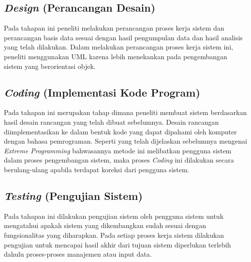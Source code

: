 \subsection{\emph{Design} (Perancangan Desain)}
Pada tahapan ini peneliti melakukan perancangan proses kerja sistem dan perancangan basis data sesuai dengan hasil pengumpulan data dan hasil analisis yang telah dilakukan. Dalam melakukan perancangan proses kerja sistem ini, peneliti menggunakan UML karena lebih menekankan pada pengembangan sistem yang berorientasi objek.
	
\subsection{\emph{Coding} (Implementasi Kode Program)}
Pada tahapan ini merupakan tahap dimana peneliti membuat sistem berdasarkan hasil desain rancangan yang telah dibuat sebelumnya. Desain rancangan diimplementasikan ke dalam bentuk kode yang dapat dipahami oleh komputer dengan bahasa pemrograman. Seperti yang telah dijelaskan sebelumnya mengenai \emph{Extreme Programming} bahwasannya metode ini melibatkan pengguna sistem dalam proses pengembangan sistem, maka proses \emph{Coding} ini dilakukan secara berulang-ulang apabila terdapat koreksi dari pengguna sistem.
	
\subsection{\emph{Testing} (Pengujian Sistem)}
Pada tahapan ini dilakukan pengujian sistem oleh pengguna sistem untuk mengatahui apakah sistem yang dikembangkan sudah sesuai dengan fungsionalitas yang diharapkan. Pada setiap proses kerja sistem dilakukan pengujian untuk mencapai hasil akhir dari tujuan sistem diperlukan terlebih dahulu proses-proses manajemen atau input data.